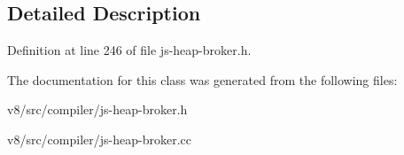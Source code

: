 \subsection{Detailed Description}


Definition at line 246 of file js-\/heap-\/broker.\+h.



The documentation for this class was generated from the following files\+:\begin{DoxyCompactItemize}
\item 
v8/src/compiler/js-\/heap-\/broker.\+h\item 
v8/src/compiler/js-\/heap-\/broker.\+cc\end{DoxyCompactItemize}
